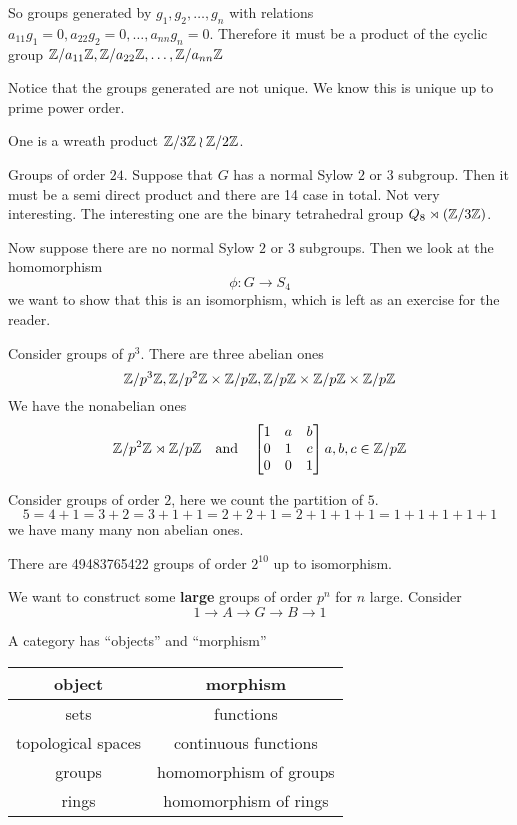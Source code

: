 So groups generated by $g_1, g_2, \ldots, g_n$ with relations $a_{11} g_1 = 0, a_{22} g_2 = 0, \ldots, a_{nn} g_n = 0$. Therefore it must be a product of the cyclic group $\mathbb Z/ a_{11} \mathbb Z, \mathbb Z/ a_{22} \mathbb Z, \ldots, \mathbb Z/ a_{nn} \mathbb Z $ 

Notice that the groups generated are not unique. We know this is unique up to prime power order.

One is a wreath product $\mathbb Z/ 3 \mathbb Z \wr \mathbb Z/ 2 \mathbb Z $.

\begin{example}
	Groups of order $24$. Suppose that $G$ has a normal Sylow $2$ or $3$ subgroup. Then it must be a semi direct product and there are 14 case in total. Not very interesting. The interesting one are the binary tetrahedral group $Q_8 \rtimes (\mathbb Z/ 3 \mathbb Z)$.

	Now suppose there are no normal Sylow $2$ or $3$ subgroups. Then we look at the homomorphism
	\[ \phi : G \to S_4\]
	we want to show that this is an isomorphism, which is left as an exercise for the reader.
\end{example}
\begin{example}
	Consider groups of $p^3$. There are three abelian ones
	\[ \mathbb Z/ p^3 \mathbb Z, \mathbb Z/ p^2 \mathbb Z \times \mathbb Z/ p \mathbb Z, \mathbb Z/ p \mathbb Z  \times \mathbb Z/ p \mathbb Z \times \mathbb Z/ p \mathbb Z   \]
	We have the nonabelian ones
	\[ \mathbb Z/ p^2 \mathbb Z \rtimes \mathbb Z/ p \mathbb Z \quad \mathrm{and} \quad \begin{bmatrix}
		1 & a & b \\
		0 & 1 & c \\
		0 & 0 & 1 \\
	\end{bmatrix} a,b,c \in \mathbb Z/ p \mathbb Z \]

\end{example}
\begin{example}
	Consider groups of order $2$, here we count the partition of $5$.
	\[ 5 = 4 + 1 = 3 + 2 =  3 + 1 + 1 = 2 + 2 + 1 = 2 + 1 + 1+ 1 = 1 + 1 + 1 + 1 + 1\]
	we have many many non abelian ones.
\end{example}
\begin{fact}
	There are 49483765422 groups of order $2^{10}$ up to isomorphism.
\end{fact}
\begin{example}
	We want to construct some \textbf{large} groups of order $p^n$ for $n$ large. Consider
	\[ 1 \to A \to G \to B \to 1\]
\end{example}
\begin{example}
	A category has ``objects'' and ``morphism''
	\begin{center}
		\begin{tabular}{c|c}
		object & morphism \\
		\hline 
		sets & functions \\
		topological spaces & continuous functions \\
		groups & homomorphism of groups \\
		rings & homomorphism of rings
	\end{tabular}
	\end{center}
\end{example}
